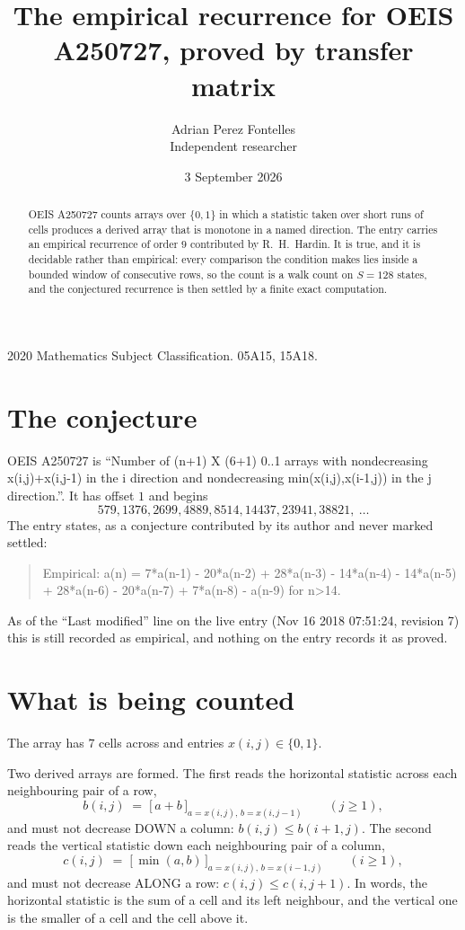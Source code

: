 \documentclass[11pt,a4paper]{article}
\title{The empirical recurrence for OEIS A250727, proved by transfer matrix}
\author{Adrian Perez Fontelles\\ \small Independent researcher}
\date{3 September 2026}
\theoremstyle{plain}
\theoremstyle{definition}
\begin{document}
\maketitle

\begin{abstract}
OEIS A250727 counts arrays over $\{0,1\}$ in which a statistic taken over short runs
of cells produces a derived array that is monotone in a named direction. The entry carries an
empirical recurrence of order $9$ contributed by R.~H.~Hardin. It is true, and it is
decidable rather than empirical: every comparison the condition makes lies inside a bounded
window of consecutive rows, so the count is a walk count on $S=128$ states, and the
conjectured recurrence is then settled by a finite exact computation.
\end{abstract}

\noindent\small 2020 Mathematics Subject Classification. 05A15, 15A18.\normalsize

\section{The conjecture}

OEIS A250727 is ``Number of (n+1) X (6+1) 0..1 arrays with nondecreasing x(i,j)+x(i,j-1) in the i direction and nondecreasing min(x(i,j),x(i-1,j)) in the j direction.''. It has offset $1$ and begins
\[
579, 1376, 2699, 4889, 8514, 14437, 23941, 38821,\ \dots
\]
The entry states, as a conjecture contributed by its author and never marked settled:
\begin{quote}
Empirical: a(n) = 7*a(n-1) - 20*a(n-2) + 28*a(n-3) - 14*a(n-4) - 14*a(n-5) + 28*a(n-6) - 20*a(n-7) + 7*a(n-8) - a(n-9) for n>14.
\end{quote}
As of the ``Last modified'' line on the live entry (Nov 16 2018 07:51:24, revision 7) this is still
recorded as empirical, and nothing on the entry records it as proved.

\section{What is being counted}

The array has $7$ cells across and entries $x(i,j)\in\{0,1\}$.

Two derived arrays are formed. The first reads the horizontal statistic across each
neighbouring pair of a row,
\[
b(i,j)\;=\;\bigl[\,a+b\,\bigr]_{a=x(i,j),\,b=x(i,j-1)}\qquad (j\ge1),
\]
and must not decrease DOWN a column: $b(i,j)\le b(i{+}1,j)$. The second reads the vertical
statistic down each neighbouring pair of a column,
\[
c(i,j)\;=\;\bigl[\,\min(a,b)\,\bigr]_{a=x(i,j),\,b=x(i{-}1,j)}\qquad (i\ge1),
\]
and must not decrease ALONG a row: $c(i,j)\le c(i,j{+}1)$. In words, the horizontal statistic
is the sum of a cell and its left neighbour, and the vertical one is
the smaller of a cell and the cell above it.
\end{document}
